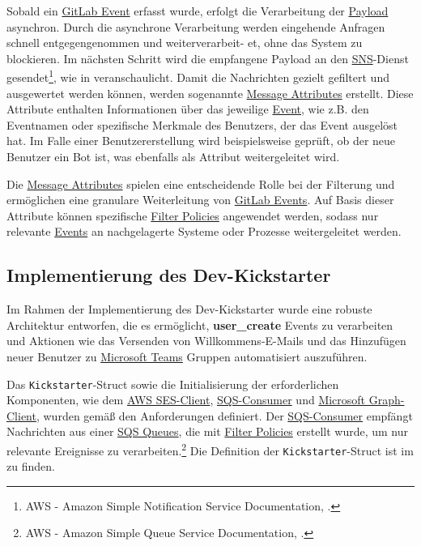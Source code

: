 Sobald ein \hyperlink{GitLabEvent}{\textcolor{AOBlau}{GitLab Event}} erfasst wurde, erfolgt die Verarbeitung der \hyperlink{Payload}{\textcolor{AOBlau}{Payload}} asynchron. Durch die asynchrone Verarbeitung werden eingehende Anfragen schnell entgegengenommen und weiterverarbeit-
et, ohne das System zu blockieren. Im nächsten Schritt wird die empfangene Payload an den \hyperlink{SNS}{\textcolor{AOBlau}{SNS}}-Dienst gesendet\footnote{AWS - Amazon Simple Notification Service Documentation, \cite{aws2023sns}.}, wie in  veranschaulicht. Damit die Nachrichten gezielt gefiltert und ausgewertet werden können, werden sogenannte \hyperlink{MessageAttributes}{\textcolor{AOBlau}{Message Attributes}} erstellt. Diese Attribute enthalten Informationen über das jeweilige \hyperlink{GitLabEvent}{\textcolor{AOBlau}{Event}}, wie z.B. den Eventnamen oder spezifische Merkmale des Benutzers, der das Event ausgelöst hat. Im Falle einer Benutzererstellung wird beispielsweise geprüft, ob der neue Benutzer ein Bot ist, was ebenfalls als Attribut weitergeleitet wird.

Die \hyperlink{MessageAttributes}{\textcolor{AOBlau}{Message Attributes}} spielen eine entscheidende Rolle bei der Filterung und ermöglichen eine granulare Weiterleitung von \hyperlink{GitLabEvent}{\textcolor{AOBlau}{GitLab Events}}. Auf Basis dieser Attribute können spezifische \hyperlink{FilterPolicies}{\textcolor{AOBlau}{Filter Policies}} angewendet werden, sodass nur relevante \hyperlink{Events}{\textcolor{AOBlau}{Events}} an nachgelagerte Systeme oder Prozesse weitergeleitet werden.

\subsection{Implementierung des Dev-Kickstarter}
\label{sec:ImplementierungBenutzeroberflaeche}

Im Rahmen der Implementierung des Dev-Kickstarter wurde eine robuste Architektur entworfen, die es ermöglicht, \textbf{user\_create} Events zu verarbeiten und Aktionen wie das Versenden von Willkommens-E-Mails und das Hinzufügen neuer Benutzer zu \hyperlink{MicrosoftTeams}{\textcolor{AOBlau}{Microsoft Teams}} Gruppen automatisiert auszuführen.

Das \texttt{Kickstarter}-Struct sowie die Initialisierung der erforderlichen Komponenten, wie dem \hyperlink{AWSSESClient}{\textcolor{AOBlau}{AWS SES-Client}}, \hyperlink{SQSConsumer}{\textcolor{AOBlau}{SQS-Consumer}} und \hyperlink{GraphClient}{\textcolor{AOBlau}{Microsoft Graph-Client}}, wurden gemäß den Anforderungen definiert. Der \hyperlink{SQSConsumer}{\textcolor{AOBlau}{SQS-Consumer}} empfängt Nachrichten aus einer \hyperlink{SQS}{\textcolor{AOBlau}{SQS Queues}}, die mit \hyperlink{FilterPolicies}{\textcolor{AOBlau}{Filter Policies}} erstellt wurde, um nur relevante Ereignisse zu verarbeiten.\footnote{AWS - Amazon Simple Queue Service Documentation, \cite{aws2023sqs}.} Die Definition der \texttt{Kickstarter}-Struct ist im  zu finden.

